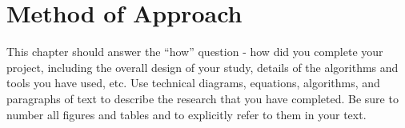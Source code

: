 \chapter{Method of Approach} 
\label{ch:method}

This chapter should answer the ``how'' question - how did you complete your project, including the overall design of your study, details of the algorithms and tools you have used, etc.  
 Use technical diagrams, equations, algorithms, and paragraphs of text to
describe the research that you have completed. Be sure to number all figures and tables and to explicitly refer to them in your text.
